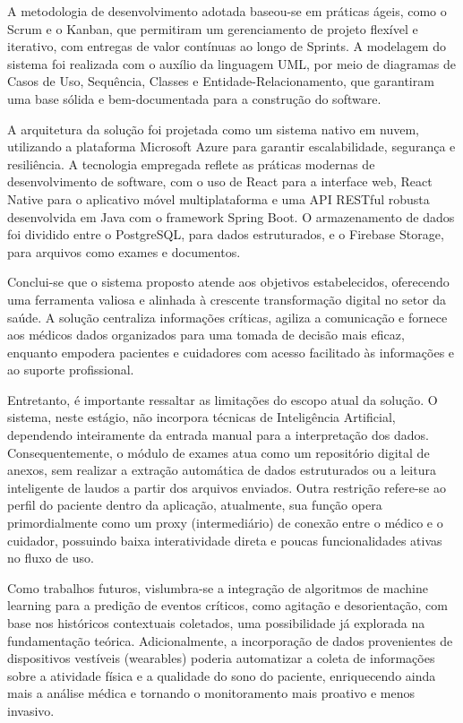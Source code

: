 \documentclass[conference,a4paper,10pt]{IEEETran}
\begin{document}
A metodologia de desenvolvimento adotada baseou-se em práticas ágeis, como o Scrum e o Kanban, que permitiram um gerenciamento de projeto flexível e iterativo, com entregas de valor contínuas ao longo de Sprints. A modelagem do sistema foi realizada com o auxílio da linguagem UML, por meio de diagramas de Casos de Uso, Sequência, Classes e Entidade-Relacionamento, que garantiram uma base sólida e bem-documentada para a construção do software. 

A arquitetura da solução foi projetada como um sistema nativo em nuvem, utilizando a plataforma Microsoft Azure para garantir escalabilidade, segurança e resiliência. A tecnologia empregada reflete as práticas modernas de desenvolvimento de software, com o uso de React para a interface web, React Native para o aplicativo móvel multiplataforma e uma API RESTful robusta desenvolvida em Java com o framework Spring Boot. O armazenamento de dados foi dividido entre o PostgreSQL, para dados estruturados, e o Firebase Storage, para arquivos como exames e documentos. 

Conclui-se que o sistema proposto atende aos objetivos estabelecidos, oferecendo uma ferramenta valiosa e alinhada à crescente transformação digital no setor da saúde. A solução centraliza informações críticas, agiliza a comunicação e fornece aos médicos dados organizados para uma tomada de decisão mais eficaz, enquanto empodera pacientes e cuidadores com acesso facilitado às informações e ao suporte profissional. 

Entretanto, é importante ressaltar as limitações do escopo atual da solução. O sistema, neste estágio, não incorpora técnicas de Inteligência Artificial, dependendo inteiramente da entrada manual para a interpretação dos dados. Consequentemente, o módulo de exames atua como um repositório digital de anexos, sem realizar a extração automática de dados estruturados ou a leitura inteligente de laudos a partir dos arquivos enviados. Outra restrição refere-se ao perfil do paciente dentro da aplicação, atualmente, sua função opera primordialmente como um proxy (intermediário) de conexão entre o médico e o cuidador, possuindo baixa interatividade direta e poucas funcionalidades ativas no fluxo de uso.

Como trabalhos futuros, vislumbra-se a integração de algoritmos de machine learning para a predição de eventos críticos, como agitação e desorientação, com base nos históricos contextuais coletados, uma possibilidade já explorada na fundamentação teórica. Adicionalmente, a incorporação de dados provenientes de dispositivos vestíveis (wearables) poderia automatizar a coleta de informações sobre a atividade física e a qualidade do sono do paciente, enriquecendo ainda mais a análise médica e tornando o monitoramento mais proativo e menos invasivo. 


\def\refname{Referências}



\end{document}
